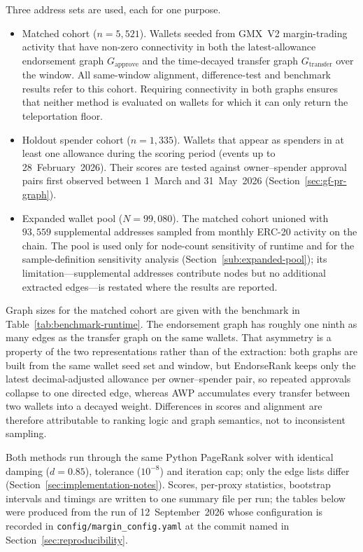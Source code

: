 Three address sets are used, each for one purpose.

\begin{itemize}
\item Matched cohort ($n=5{,}521$). Wallets seeded from GMX~V2 margin-trading activity that have non-zero connectivity in both the latest-allowance endorsement graph $G_{\text{approve}}$ and the time-decayed transfer graph $G_{\text{transfer}}$ over the window. All same-window alignment, difference-test and benchmark results refer to this cohort. Requiring connectivity in both graphs ensures that neither method is evaluated on wallets for which it can only return the teleportation floor.
\item Holdout spender cohort ($n=1{,}335$). Wallets that appear as spenders in at least one allowance during the scoring period (events up to 28~February~2026). Their scores are tested against owner--spender approval pairs first observed between 1~March and 31~May~2026 (Section~\ref{sec:gf-pr-graph}).
\item Expanded wallet pool ($N=99{,}080$). The matched cohort unioned with $93{,}559$ supplemental addresses sampled from monthly ERC-20 activity on the chain. The pool is used only for node-count sensitivity of runtime and for the sample-definition sensitivity analysis (Section~\ref{sub:expanded-pool}); its limitation---supplemental addresses contribute nodes but no additional extracted edges---is restated where the results are reported.
\end{itemize}

Graph sizes for the matched cohort are given with the benchmark in Table~\ref{tab:benchmark-runtime}. The endorsement graph has roughly one ninth as many edges as the transfer graph on the same wallets. That asymmetry is a property of the two representations rather than of the extraction: both graphs are built from the same wallet seed set and window, but EndorseRank keeps only the latest decimal-adjusted allowance per owner--spender pair, so repeated approvals collapse to one directed edge, whereas AWP accumulates every transfer between two wallets into a decayed weight. Differences in scores and alignment are therefore attributable to ranking logic and graph semantics, not to inconsistent sampling.


Both methods run through the same Python PageRank solver with identical damping ($d=0.85$), tolerance ($10^{-8}$) and iteration cap; only the edge lists differ (Section~\ref{sec:implementation-notes}). Scores, per-proxy statistics, bootstrap intervals and timings are written to one summary file per run; the tables below were produced from the run of 12~September~2026 whose configuration is recorded in \texttt{config/margin\_config.yaml} at the commit named in Section~\ref{sec:reproducibility}.

